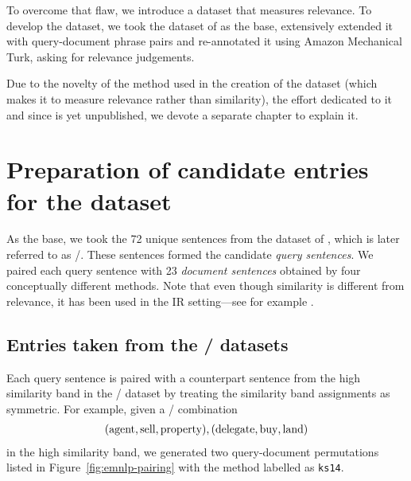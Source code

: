 To overcome that flaw, we introduce a dataset that measures relevance. To develop the dataset, we took the  dataset of  as the base, extensively extended it with query-document phrase pairs and re-annotated it using Amazon Mechanical Turk, asking for relevance judgements.

Due to the novelty of the method used in the creation of the dataset (which makes it to measure relevance rather than similarity), the effort dedicated to it and since is yet unpublished, we devote a separate chapter to explain it.

\section{Preparation of candidate entries for the dataset}
\label{sec:design}

As the base, we took the 72 unique sentences from the dataset of , which is later referred to as \emnlp/.\footnotemark{} These sentences formed the candidate \emph{query sentences}. We paired each query sentence with 23 \emph{document sentences} obtained by four conceptually different methods. Note that even though similarity is different from relevance, it has been used in the IR setting---see for example .
%



\subsection{Entries taken from the \emnlp/ datasets}

Each query sentence is paired with a counterpart sentence from the high similarity band\footnotemark{} in the \emnlp/ dataset by treating the similarity band assignments as symmetric. For example, given a \emnlp/ combination
%
%
\begin{eqnarray*}
(\textmd{agent}, \textmd{sell}, \textmd{property}),
(\textmd{delegate}, \textmd{buy}, \textmd{land})
\end{eqnarray*}
%
in the high similarity band, we generated two query-document permutations listed
in Figure~\ref{fig:emnlp-pairing} with the method labelled as \texttt{ks14}.

